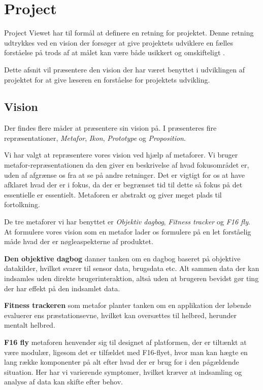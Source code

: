 \section{Project}
Project Viewet har til formål at definere en retning for projektet.
Denne retning udtrykkes ved en vision der forsøger at give projektets udviklere en fælles forståelse på trods af at målet kan være både usikkert og omskifteligt \cite[Kapitel 15 - Project]{art:essence}.

Dette afsnit vil præsentere den vision der har været benyttet i udviklingen af projektet for at give læseren en forståelse for projektets udvikling.

\subsection{Vision}\label{vision}
Der findes flere måder at præsentere sin vision på. 
I \citet[Kapitel 24 - Representation]{art:essence} præsenteres fire repræsentationer, \textit{Metafor}, \textit{Ikon}, \textit{Prototype} og \textit{Proposition}.

Vi har valgt at repræsentere vores vision ved hjælp af metaforer.
Vi bruger metafor-repræsentationen da den giver en beskrivelse af hvad fokusområdet er, uden af afgrænse os fra at se på andre retninger.
Det er vigtigt for os at have afklaret hvad der er i fokus, da der er begrænset tid til dette så fokus på det essentielle er essentielt.
Metaforen er abstrakt og giver meget plads til fortolkning.

De tre metaforer vi har benyttet er \textit{Objektiv dagbog}, \textit{Fitness tracker} og \textit{F16 fly}.
At formulere vores vision som en metafor lader os formulere på en let forståelig måde hvad der er nøgleaspekterne af produktet.

\textbf{Den objektive dagbog} danner tanken om en dagbog baseret på objektive datakilder, hvilket svarer til sensor data, brugsdata etc.
Alt sammen data der kan indsamles uden direkte brugerinteraktion, altså uden at brugeren bevidst gør ting der har effekt på den indsamlet data.

\textbf{Fitness trackeren} som metafor planter tanken om en applikation der løbende evaluerer ens præstationsevne, hvilket kan oversættes til helbred, herunder mentalt helbred.

\textbf{F16 fly} metaforen henvender sig til designet af platformen, der er tiltænkt at være modulær, ligesom det er tilfældet med F16-flyet, hvor man kan hægte en lang række komponenter på alt efter hvad der er brug for i den pågældende situation.
Her har vi varierende symptomer, hvilket kræver at indsamling og analyse af data kan skifte efter behov.

